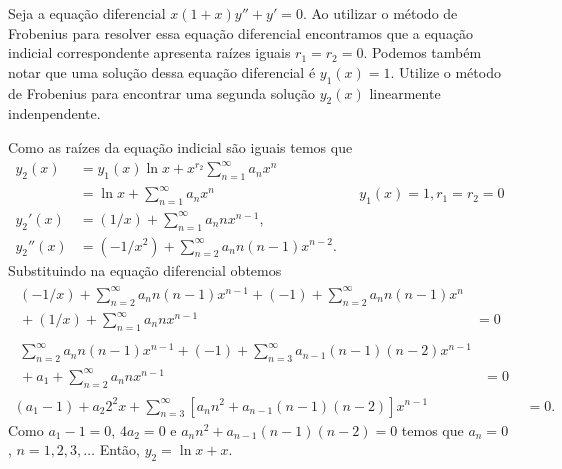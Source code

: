 \documentclass[a4paper,12pt, leqno, answers]{exam}
\begin{document}
\begin{questions}
    \question[P1 de 2011] Seja a equa\c{c}\~{a}o diferencial $x (1 + x) y'' + y' = 0$. Ao utilizar o m\'{e}todo de Frobenius para resolver essa equa\c{c}\~{a}o diferencial encontramos que a equa\c{c}\~{a}o indicial correspondente apresenta ra\'{i}zes iguais $r_1 = r_2 = 0$. Podemos tamb\'{e}m notar que uma solu\c{c}\~{a}o dessa equa\c{c}\~{a}o diferencial \'{e} $y_1(x) = 1$. Utilize o m\'{e}todo de Frobenius para encontrar uma segunda solu\c{c}\~{a}o $y_2(x)$ linearmente indenpendente.
    \begin{solution}
        Como as ra\'{i}zes da equa\c{c}\~{a}o indicial s\~{a}o iguais temos que
        \begin{align*}
            y_2(x) &= y_1(x) \ln x + x^{r_2} \sum_{n = 1}^\infty a_n x^n \\
            &= \ln x + \sum_{n = 1}^\infty a_n x^n && y_1(x) = 1, r_1 = r_2 = 0 \\
            y_2'(x) &= (1/x) + \sum_{n = 1}^\infty a_n n x^{n - 1}, \\
            y_2''(x) &= (-1/x^2) + \sum_{n = 2}^\infty a_n n (n - 1) x^{n - 2}.
        \end{align*}
        Substituindo na equa\c{c}\~{a}o diferencial obtemos
        \begin{align*}
            \begin{split}
                (-1/x) + \sum_{n = 2}^\infty a_n n (n - 1) x^{n - 1} + (-1) + \sum_{n = 2}^\infty a_n n (n - 1) x^n & \\
                {}+ (1/x) + \sum_{n = 1}^\infty a_n n x^{n - 1} &= 0
            \end{split} \\
            \begin{split}
                \sum_{n = 2}^\infty a_n n (n - 1) x^{n - 1} + (-1) + \sum_{n = 3}^\infty a_{n - 1} (n - 1) (n - 2) x^{n - 1} & \\
                {}+ a_1 + \sum_{n = 2}^\infty a_n n x^{n - 1} &= 0
            \end{split} \\
            (a_1 - 1) + a_2 2^2 x + \sum_{n = 3}^\infty \left[ a_n n^2 + a_{n - 1} (n - 1) (n - 2) \right] x^{n - 1} &= 0.
        \end{align*}
        Como $a_1 - 1= 0$, $4 a_2 = 0$ e $a_n n^2 + a_{n - 1} (n - 1) (n - 2) = 0$ temos que $a_n = 0$, $n = 1, 2, 3, \ldots$ Ent\~{a}o, $y_2 = \ln x + x$.
    \end{solution}


\end{questions}
\end{document}
